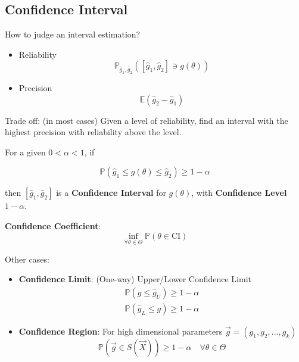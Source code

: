     \subsection{Confidence Interval}\label{SubSectionConfidenceInterval}
    How to judge an interval estimation?
    \begin{itemize}
        \item Reliability
        \begin{equation}\mathbb{P}_{\hat{g}_1,\hat{g}_2}([\hat{g}_1,\hat{g}_2]\ni g(\theta))\end{equation}
        \item Precision
        \begin{equation}\mathbb{E}(\hat{g}_2-\hat{g}_1)\end{equation}
    \end{itemize}

    Trade off: (in most cases) Given a level of reliability, find an interval with the highest precision with reliability above the level.


\begin{point}
    For a given $0<\alpha<1$, if 
\end{point}

    \begin{equation}
        \mathbb{P}(\hat{g}_1\leq g(\theta)\leq \hat{g}_2)\geq 1-\alpha
    \end{equation}

    then $[\hat{g}_1,\hat{g}_2]$ is a \textbf{Confidence Interval} for $g(\theta)$, with \textbf{Confidence Level} $1-\alpha$. 
    
    \textbf{Confidence Coefficient}:
    \begin{equation}\inf_{\forall\theta\in\Theta}\mathbb{P}(
        \theta\in\mathrm{CI}
    )\end{equation}

    Other cases:
    \begin{itemize}[topsep=-4pt]
        \item \textbf{Confidence Limit}: (One-way) Upper/Lower Confidence Limit
    \begin{align}
        \mathbb{P}(g\leq \hat{g}_U)\geq 1-\alpha\\
        \mathbb{P}(\hat{g}_L\leq g)\geq 1-\alpha
    \end{align}
        \item \textbf{Confidence Region}: For high dimensional parameters $\vec{g}=(g_1,g_2,\ldots,g_k)$
        \begin{equation}\mathbb{P}(\vec{g}\in S(\vec{X}))\geq 1-\alpha\quad \forall \theta\in\Theta \end{equation}
        
    \end{itemize}

